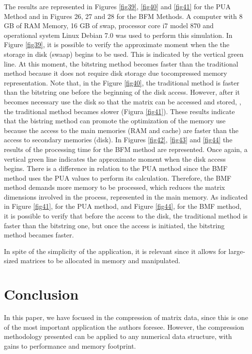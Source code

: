 \documentclass[10pt]{article}
\begin{document}
The results are represented in Figures \ref{fig39}, \ref{fig40} and \ref{fig41} for the PUA Method and in Figures 26, 27 and 28 for the 
BFM Methods.  A computer with 8 GB of RAM Memory, 16 GB of swap, processor core i7 model 870
and operational 
system Linux Debian 7.0 was used to perform this simulation. In Figure \ref{fig39}, it is possible to verify the approximate 
moment  when the  the storage in disk (swaap) begins to be used. This is indicated by the vertical green line. 
At this moment, the bitstring method becomes faster than the traditional method because it does not require disk 
storage due tocompressed memory representation. Note that, in the Figure \ref{fig40}, the traditional method is faster 
than the bitstring one before the beginning of the disk access. However, after it becomes necessary use the disk 
so that the matrix can be accessed and stored, , the traditional method  becames slower (Figura \ref{fig41}). 
These results 
indicate that the bistring method can promote the optimization of the memory use because the access to the main 
memories (RAM and cache) are faster than the access to secondary memories (disk). In Figures \ref{fig42}, 
\ref{fig43} and \ref{fig44} the 
results of the processing time for  the BFM method are represented. Once again, a vertical green line indicates 
the approximate moment when the disk access begins. There is a difference in relation to the PUA method since the 
BMF method uses the PUA values to perform its calculation. Therefore, the BMF method demands more memory to be 
processed, which reduces the matrix dimensions involved in the process, represented in the main memory. As 
indicated in Figure \ref{fig41}, for the PUA method, and Figure \ref{fig44}, for the BMF method, it is possible 
to verify that 
before the access to the disk, the traditional method is faster than the bitstring one, but once the access 
is initiated,  the bitstring method becames faster.

In spite of the simplicity of the application, it is relevant since  it allows for large-sized matrices to be 
allocated in memory and manipulated.

\section*{Conclusion}

In this paper, we have focused in the compression of matrix data, since this is
one of the most important application the authors foresee. However, the
compression methodology presented can be applied to any numerical data
structure, with gains to performance and memory footprint\cite{teseCrysttian}. 
\end{document}
